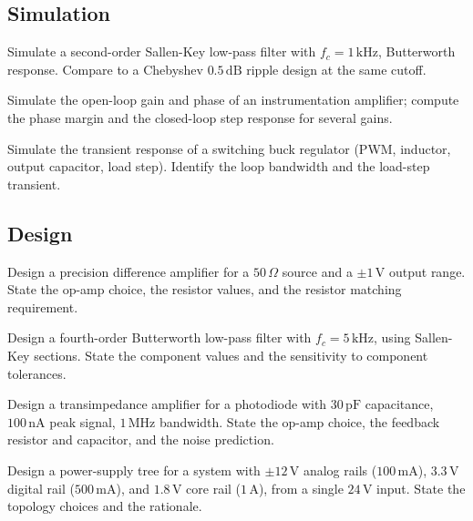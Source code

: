 \subsection*{Simulation}

\begin{exercise}
Simulate a second-order Sallen-Key low-pass filter with $f_c = 1\,\text{kHz}$, Butterworth response. Compare to a Chebyshev $0.5\,\text{dB}$ ripple design at the same cutoff.
\end{exercise}

\begin{exercise}
Simulate the open-loop gain and phase of an instrumentation amplifier; compute the phase margin and the closed-loop step response for several gains.
\end{exercise}

\begin{exercise}
Simulate the transient response of a switching buck regulator (PWM, inductor, output capacitor, load step). Identify the loop bandwidth and the load-step transient.
\end{exercise}

\subsection*{Design}

\begin{exercise}
Design a precision difference amplifier for a $50\,\Omega$ source and a $\pm 1\,\text{V}$ output range. State the op-amp choice, the resistor values, and the resistor matching requirement.
\end{exercise}

\begin{exercise}
Design a fourth-order Butterworth low-pass filter with $f_c = 5\,\text{kHz}$, using Sallen-Key sections. State the component values and the sensitivity to component tolerances.
\end{exercise}

\begin{exercise}
Design a transimpedance amplifier for a photodiode with $30\,\text{pF}$ capacitance, $100\,\text{nA}$ peak signal, $1\,\text{MHz}$ bandwidth. State the op-amp choice, the feedback resistor and capacitor, and the noise prediction.
\end{exercise}

\begin{exercise}
Design a power-supply tree for a system with $\pm 12\,\text{V}$ analog rails ($100\,\text{mA}$), $3.3\,\text{V}$ digital rail ($500\,\text{mA}$), and $1.8\,\text{V}$ core rail ($1\,\text{A}$), from a single $24\,\text{V}$ input. State the topology choices and the rationale.
\end{exercise}

